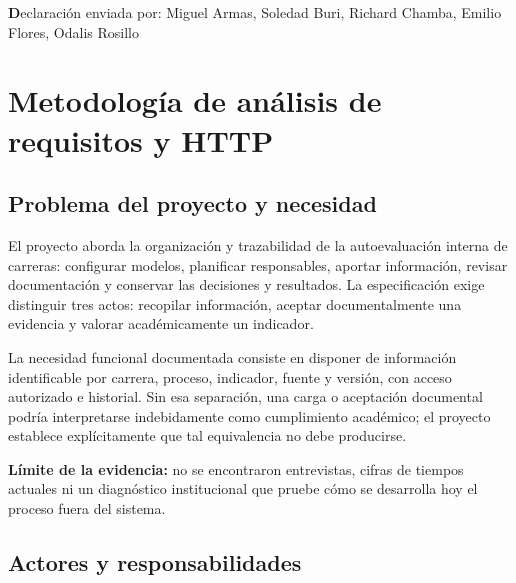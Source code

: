 \documentclass[12pt,a4paper]{report}
\begin{document}
\noindent\textbf Declaración enviada por: Miguel Armas, Soledad Buri, Richard Chamba, Emilio Flores, Odalis Rosillo

\chapter{Metodología de análisis de requisitos y
HTTP}

\section{Problema del proyecto y
necesidad}\label{problema-del-proyecto-y-necesidad}

El proyecto aborda la organización y trazabilidad de la autoevaluación
interna de carreras: configurar modelos, planificar responsables,
aportar información, revisar documentación y conservar las decisiones y
resultados. La especificación exige distinguir tres actos: recopilar
información, aceptar documentalmente una evidencia y valorar
académicamente un indicador.

La necesidad funcional documentada consiste en disponer de información
identificable por carrera, proceso, indicador, fuente y versión, con
acceso autorizado e historial. Sin esa separación, una carga o
aceptación documental podría interpretarse indebidamente como
cumplimiento académico; el proyecto establece explícitamente que tal
equivalencia no debe producirse.

\textbf{Límite de la evidencia:} no se encontraron entrevistas, cifras
de tiempos actuales ni un diagnóstico institucional que pruebe cómo se
desarrolla hoy el proceso fuera del sistema.

\section{Actores y responsabilidades}\label{actores-y-responsabilidades}
\end{document}
